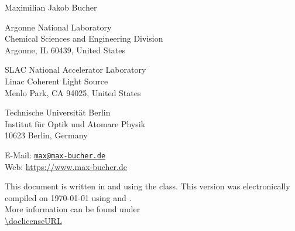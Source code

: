 \begin{flushleft}
{\Large Maximilian Jakob Bucher}\\
\footnotesize{Argonne National Laboratory\\
Chemical Sciences and Engineering Division\\
Argonne, IL 60439, United States\\
\vspace{0.5cm}
\thispagestyle{empty}

SLAC National Accelerator Laboratory\\
Linac Coherent Light Source\\
Menlo Park, CA 94025, United States
\vspace{0.5cm}

Technische Universität Berlin\\
Institut für Optik und Atomare Physik\\
10623 Berlin, Germany
\vspace{0.5cm}

E-Mail: \href{mailto:max@max-bucher.de}{\nolinkurl{max@max-bucher.de} }\\
Web: \url{https://www.max-bucher.de}}
\end{flushleft}
%
%
%
\vspace{7.5cm}
\footnotesize{This document is written in  and  using the  class. This version was electronically compiled on {\isodate\today} using  and .}\\
%
\null \vspace{1cm}
%
\normalsize{\doclicenseThis
More information can be found under\\
\url{\doclicenseURL}}
